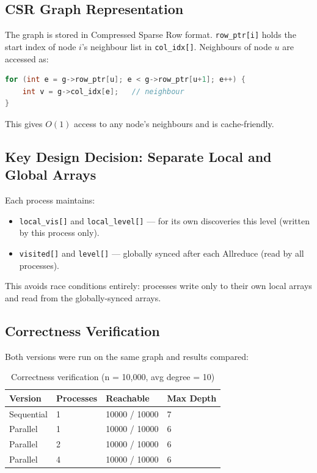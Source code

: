 \documentclass[12pt,a4paper]{article}
\begin{document}
\subsection{CSR Graph Representation}

The graph is stored in Compressed Sparse Row format. \texttt{row\_ptr[i]} holds
the start index of node $i$'s neighbour list in \texttt{col\_idx[]}. Neighbours
of node $u$ are accessed as:

\begin{lstlisting}[language=C, caption={CSR neighbour traversal}]
for (int e = g->row_ptr[u]; e < g->row_ptr[u+1]; e++) {
    int v = g->col_idx[e];   // neighbour
}
\end{lstlisting}

This gives $O(1)$ access to any node's neighbours and is cache-friendly.

\subsection{Key Design Decision: Separate Local and Global Arrays}

Each process maintains:
\begin{itemize}[leftmargin=1.5em]
    \item \texttt{local\_vis[]} and \texttt{local\_level[]} --- for its own
          discoveries this level (written by this process only).
    \item \texttt{visited[]} and \texttt{level[]} --- globally synced after
          each Allreduce (read by all processes).
\end{itemize}

This avoids race conditions entirely: processes write only to their own local
arrays and read from the globally-synced arrays.

\subsection{Correctness Verification}

Both versions were run on the same graph and results compared:

\begin{table}[H]
\centering
\caption{Correctness verification (n = 10,000, avg degree = 10)}
\begin{tabular}{C{2.5cm} C{2cm} C{2.5cm} C{2cm}}
\toprule
{}
{\color{white}\textbf{Version}} &
{\color{white}\textbf{Processes}} &
{\color{white}\textbf{Reachable}} &
{\color{white}\textbf{Max Depth}} \\
\midrule
{}
Sequential & 1 & 10000 / 10000 & 7 \\
Parallel   & 1 & 10000 / 10000 & 6 \\
Parallel   & 2 & 10000 / 10000 & 6 \\
Parallel   & 4 & 10000 / 10000 & 6 \\
\bottomrule
\end{tabular}
\end{table}
\end{document}
